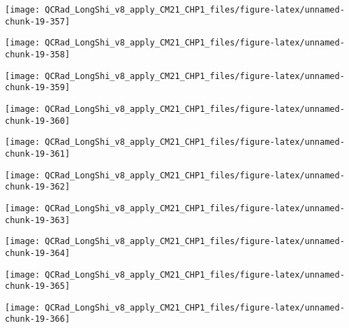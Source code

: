 \documentclass[
  10pt,
  a4paper,oneside]{article}
\begin{document}
\begin{center}\texttt{[image: QCRad\_LongShi\_v8\_apply\_CM21\_CHP1\_files/figure-latex/unnamed-chunk-19-357]} \end{center}

\begin{center}\texttt{[image: QCRad\_LongShi\_v8\_apply\_CM21\_CHP1\_files/figure-latex/unnamed-chunk-19-358]} \end{center}

\begin{center}\texttt{[image: QCRad\_LongShi\_v8\_apply\_CM21\_CHP1\_files/figure-latex/unnamed-chunk-19-359]} \end{center}

\begin{center}\texttt{[image: QCRad\_LongShi\_v8\_apply\_CM21\_CHP1\_files/figure-latex/unnamed-chunk-19-360]} \end{center}

\begin{center}\texttt{[image: QCRad\_LongShi\_v8\_apply\_CM21\_CHP1\_files/figure-latex/unnamed-chunk-19-361]} \end{center}

\begin{center}\texttt{[image: QCRad\_LongShi\_v8\_apply\_CM21\_CHP1\_files/figure-latex/unnamed-chunk-19-362]} \end{center}

\begin{center}\texttt{[image: QCRad\_LongShi\_v8\_apply\_CM21\_CHP1\_files/figure-latex/unnamed-chunk-19-363]} \end{center}

\begin{center}\texttt{[image: QCRad\_LongShi\_v8\_apply\_CM21\_CHP1\_files/figure-latex/unnamed-chunk-19-364]} \end{center}

\begin{center}\texttt{[image: QCRad\_LongShi\_v8\_apply\_CM21\_CHP1\_files/figure-latex/unnamed-chunk-19-365]} \end{center}

\begin{center}\texttt{[image: QCRad\_LongShi\_v8\_apply\_CM21\_CHP1\_files/figure-latex/unnamed-chunk-19-366]} \end{center}
\end{document}
